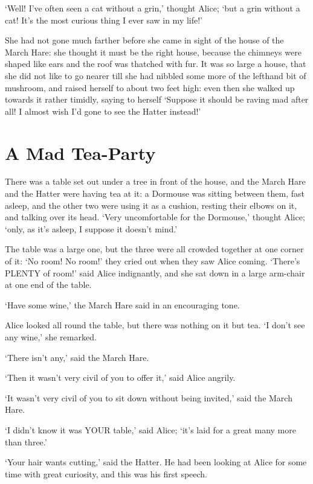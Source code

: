 \documentclass[12pt]{article}
\begin{document}
\begin{Parallel}[p]{}{}
{‘Well! I’ve often seen a cat without a grin,’ thought Alice; ‘but a grin without a cat! It’s the most curious thing I ever saw in my life!’

She had not gone much farther before she came in sight of the house of the March Hare: she thought it must be the right house, because the chimneys were shaped like ears and the roof was thatched with fur. It was so large a house, that she did not like to go nearer till she had nibbled some more of the lefthand bit of mushroom, and raised herself to about two feet high: even then she walked up towards it rather timidly, saying to herself ‘Suppose it should be raving mad after all! I almost wish I’d gone to see the Hatter instead!’




\section{A Mad Tea-Party}

There was a table set out under a tree in front of the house, and the March Hare and the Hatter were having tea at it: a Dormouse was sitting between them, fast asleep, and the other two were using it as a cushion, resting their elbows on it, and talking over its head. ‘Very uncomfortable for the Dormouse,’ thought Alice; ‘only, as it’s asleep, I suppose it doesn’t mind.’

The table was a large one, but the three were all crowded together at one corner of it: ‘No room! No room!’ they cried out when they saw Alice coming. ‘There’s PLENTY of room!’ said Alice indignantly, and she sat down in a large arm-chair at one end of the table.

‘Have some wine,’ the March Hare said in an encouraging tone.

Alice looked all round the table, but there was nothing on it but tea. ‘I don’t see any wine,’ she remarked.

‘There isn’t any,’ said the March Hare.

‘Then it wasn’t very civil of you to offer it,’ said Alice angrily.

‘It wasn’t very civil of you to sit down without being invited,’ said the March Hare.

‘I didn’t know it was YOUR table,’ said Alice; ‘it’s laid for a great many more than three.’

‘Your hair wants cutting,’ said the Hatter. He had been looking at Alice for some time with great curiosity, and this was his first speech.

}
\end{Parallel}
\end{document}
